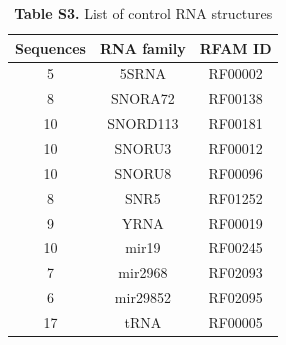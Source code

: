 \documentclass{bmcart}
\begin{document}
\begin{table}
\centering
\caption*{\textbf{Table S3.}  List of control RNA structures }
\begin{tabular}{ccc}
\hline
Sequences & RNA family & RFAM ID \\
\hline
   5 & 5SRNA & RF00002 \\
   8 & SNORA72 & RF00138 \\
  10 & SNORD113 & RF00181\\
  10 & SNORU3 & RF00012\\
  10 & SNORU8 & RF00096\\
   8 & SNR5 & RF01252\\
   9 & YRNA & RF00019\\
  10 & mir19 & RF00245\\
   7 & mir2968 & RF02093\\
   6 & mir29852 & RF02095\\
  17 & tRNA & RF00005\\
\hline
\end{tabular}
\end{table}
\end{document}
